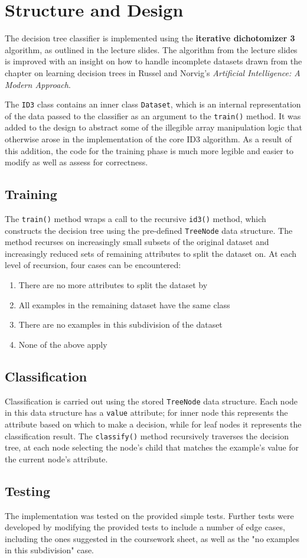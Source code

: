 \documentclass[10pt, titlepage]{article}
\begin{document}
\section{Structure and Design}
The decision tree classifier is implemented using the \textbf{iterative dichotomizer 3} algorithm, as outlined in the lecture slides. The algorithm from the lecture slides is improved with an insight on how to handle incomplete datasets drawn from the chapter on learning decision trees in Russel and Norvig's \textit{Artificial Intelligence: A Modern Approach}.

The \texttt{ID3} class contains an inner class \texttt{Dataset}, which is an internal representation of the data passed to the classifier as an argument to the \texttt{train()} method. It was added to the design to abstract some of the illegible array manipulation logic that otherwise arose in the implementation of the core ID3 algorithm. As a result of this addition, the code for the training phase is much more legible and easier to modify as well as assess for correctness.


\subsection{Training}
The \texttt{train()} method wraps a call to the recursive \texttt{id3()} method, which constructs the decision tree using the pre-defined \texttt{TreeNode} data structure. The method recurses on increasingly small subsets of the original dataset and increasingly reduced sets of remaining attributes to split the dataset on. At each level of recursion, four cases can be encountered:

\begin{enumerate}
\item There are no more attributes to split the dataset by
\item All examples in the remaining dataset have the same class
\item There are no examples in this subdivision of the dataset
\item None of the above apply
\end{enumerate}


\subsection{Classification}
Classification is carried out using the stored \texttt{TreeNode} data structure. Each node in this data structure has a \texttt{value} attribute; for inner node this represents the attribute based on which to make a decision, while for leaf nodes it represents the classification result. The \texttt{classify()} method recursively traverses the decision tree, at each node selecting the node's child that matches the example's value for the current node's attribute.

\subsection{Testing}
The implementation was tested on the provided simple tests. Further tests were developed by modifying the provided tests to include a number of edge cases, including the ones suggested in the coursework sheet, as well as the "no examples in this subdivision" case.
\end{document}
